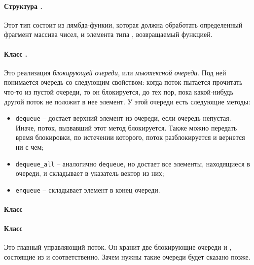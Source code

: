 \documentclass[a4paper, 12pt, twoside]{article}
\begin{document}
\paragraph{Структура \texttt{}.}
Этот тип состоит из лямбда-функии, которая должна обработать определенный фрагмент массива чисел, и элемента типа \texttt{}, возвращаемый функцией.
\paragraph{Класс \texttt{}.}
Это реализация \textit{блокирующей очереди}, или \textit{мьютексной очереди}.  
Под ней понимается очередь со следующим свойством: когда поток пытается прочитать что-то из пустой очереди, то он блокируется, до тех пор, пока какой-нибудь другой поток не положит в нее элемент.
У этой очереди есть следующие методы:
\begin{itemize}
\item \texttt{dequeue} -- достает верхний элемент из очереди, если очередь непустая.
Иначе, поток, вызвавший этот метод блокируется. Также можно передать время блокировки, по истечении которого, поток разблокируется и вернется ни с чем;
\item \texttt{dequeue\_all} -- аналогично \texttt{dequeue}, но достает все элементы, находящиеся в очереди, и складывает в указатель вектор из них;
\item \texttt{enqueue} -- складывает элемент в конец очереди.
\end{itemize}
\paragraph{Класс \texttt{}}
\paragraph{Класс \texttt{}}
Это главный управляющий поток.
Он хранит две блокирующие очереди \texttt{} и \texttt{}, состоящие из \texttt{} и \texttt{} соответственно. 
Зачем нужны такие очереди будет сказано позже.
\end{document}
